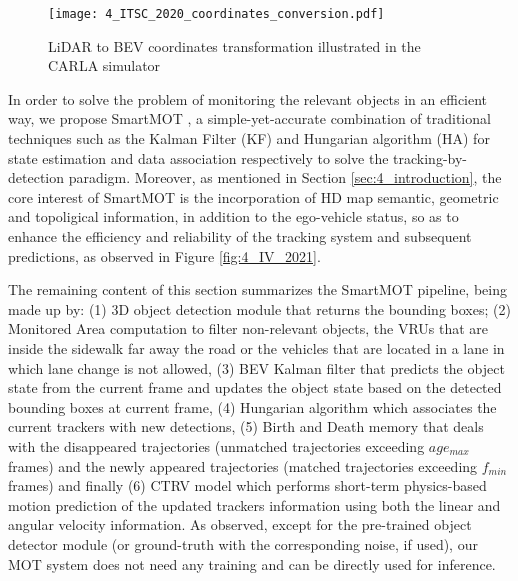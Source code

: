 \begin{figure}[h]
	\centering
	\texttt{[image: 4\_ITSC\_2020\_coordinates\_conversion.pdf]}
	\caption{LiDAR to BEV coordinates transformation illustrated in the CARLA simulator}
	\label{fig:4_ITSC_2020_coordinates_conversion}
\end{figure}

In order to solve the problem of monitoring the relevant objects in an efficient way, we propose SmartMOT \cite{gomez2021smartmot}, a simple-yet-accurate combination of traditional techniques such as the Kalman Filter (KF) \cite{kalman1960new} and Hungarian algorithm (HA) \cite{kuhn1955hungarian} for state estimation and data association respectively to solve the tracking-by-detection paradigm. Moreover, as mentioned in Section \ref{sec:4_introduction}, the core interest of SmartMOT is the incorporation of HD map semantic, geometric and topoligical information, in addition to the ego-vehicle status, so as to enhance the efficiency and reliability of the tracking system and subsequent predictions, as observed in Figure \ref{fig:4_IV_2021}. 

The remaining content of this section summarizes the SmartMOT pipeline, being made up by: (1) 3D object detection module that returns the bounding boxes; (2) Monitored Area computation to filter non-relevant objects, \eg the VRUs that are inside the sidewalk far away the road or the vehicles that are located in a lane in which lane change is not allowed, (3) BEV Kalman filter that predicts the object state from the current frame and updates the object state based on the detected bounding boxes at current frame, (4) Hungarian algorithm which associates the current trackers with new detections, (5) Birth and Death memory that deals with the disappeared trajectories (unmatched trajectories exceeding ${age_{max}}$ frames) and the newly appeared trajectories (matched trajectories exceeding ${f_{min}}$ frames) and finally (6) \ac{CTRV} model which performs short-term physics-based motion prediction of the updated trackers information using both the linear and angular velocity information. As observed, except for the pre-trained object detector module (or ground-truth with the corresponding noise, if used), our \ac{MOT} system does not need any training and can be directly used for inference.

